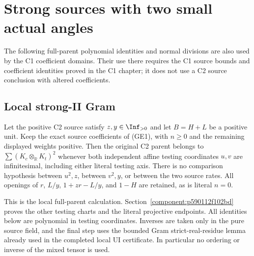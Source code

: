 \section{Strong sources with two small actual angles}
The following full-parent polynomial identities and normal divisions are
also used by the C1 coefficient domains. Their use there requires the
C1 source bounds and coefficient identities proved in the C1 chapter;
it does not use a C2 source conclusion with altered coefficients.

\subsection{Local strong-II Gram}
\label{component:pe16499ccc4c6}

\label{pe16499ccc4c6:sec:r7-local-strong-II}

\begin{theorem}
Let the positive C2 source satisfy $z,y\in\Inf_{>0}$ and let
$B=H+L$ be a positive unit.  Keep the exact source coefficients of
(GE1), with $n\geq0$ and the remaining displayed weights positive.
Then the original C2 parent belongs to $\sum(K_c\otimes_{\mathbb R}
K_t)^2$ whenever both independent affine testing coordinates $u,v$
are infinitesimal, including either literal testing axis.
There is no comparison hypothesis between $u^2,z$, between $v^2,y$,
or between the two source rates.  All openings of $r$, $L/y$,
$1+zr-L/y$, and $1-H$ are retained, as is literal $n=0$.
\end{theorem}

This is the local full-parent calculation. Section~\ref{component:p590112f102bd} proves the other testing charts and the literal projective endpoints.
All identities below are polynomial in testing coordinates.  Inverses
are taken only in the pure source field, and the final step uses the
bounded Gram strict-real-residue lemma already used in the completed
local UI certificate.  In particular no ordering or inverse of the
mixed tensor is used.

